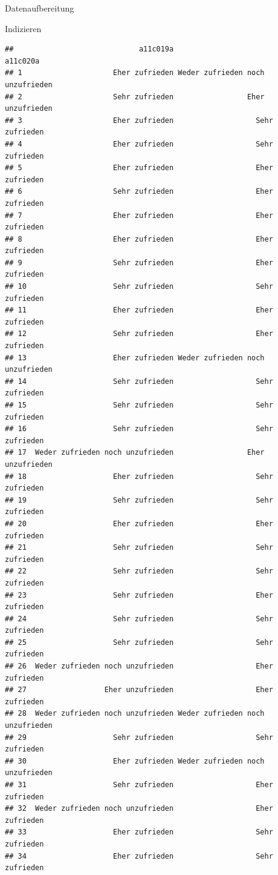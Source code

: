\documentclass[ignorenonframetext,]{beamer}
\begin{document}
\begin{frame}[fragile]{Datenaufbereitung}
\begin{block}{Indizieren}
\begin{verbatim}
##                             a11c019a                         a11c020a
## 1                     Eher zufrieden Weder zufrieden noch unzufrieden
## 2                     Sehr zufrieden                 Eher unzufrieden
## 3                     Eher zufrieden                   Sehr zufrieden
## 4                     Eher zufrieden                   Sehr zufrieden
## 5                     Eher zufrieden                   Eher zufrieden
## 6                     Sehr zufrieden                   Eher zufrieden
## 7                     Eher zufrieden                   Eher zufrieden
## 8                     Eher zufrieden                   Eher zufrieden
## 9                     Sehr zufrieden                   Eher zufrieden
## 10                    Sehr zufrieden                   Sehr zufrieden
## 11                    Eher zufrieden                   Eher zufrieden
## 12                    Sehr zufrieden                   Eher zufrieden
## 13                    Eher zufrieden Weder zufrieden noch unzufrieden
## 14                    Sehr zufrieden                   Sehr zufrieden
## 15                    Sehr zufrieden                   Sehr zufrieden
## 16                    Sehr zufrieden                   Sehr zufrieden
## 17  Weder zufrieden noch unzufrieden                 Eher unzufrieden
## 18                    Eher zufrieden                   Sehr zufrieden
## 19                    Sehr zufrieden                   Sehr zufrieden
## 20                    Eher zufrieden                   Eher zufrieden
## 21                    Sehr zufrieden                   Sehr zufrieden
## 22                    Sehr zufrieden                   Sehr zufrieden
## 23                    Sehr zufrieden                   Eher zufrieden
## 24                    Sehr zufrieden                   Sehr zufrieden
## 25                    Sehr zufrieden                   Sehr zufrieden
## 26  Weder zufrieden noch unzufrieden                   Eher zufrieden
## 27                  Eher unzufrieden                   Eher zufrieden
## 28  Weder zufrieden noch unzufrieden Weder zufrieden noch unzufrieden
## 29                    Sehr zufrieden                   Sehr zufrieden
## 30                    Eher zufrieden Weder zufrieden noch unzufrieden
## 31                    Sehr zufrieden                   Eher zufrieden
## 32  Weder zufrieden noch unzufrieden                   Eher zufrieden
## 33                    Eher zufrieden                   Sehr zufrieden
## 34                    Eher zufrieden                   Sehr zufrieden

\end{verbatim}
\end{block}
\end{frame}
\end{document}
